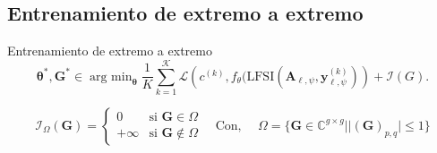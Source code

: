 \documentclass[aspectratio=169,t,xcolor=table]{beamer}
\DeclareMathOperator*{\argmin}{arg \ min}
\begin{document}
\subsection{Entrenamiento de extremo a extremo}
\begin{frame}{Entrenamiento de extremo a extremo}
\tiny
\begin{equation}
\mathbf{\theta}^*, \mathbf{G}^* \in  \argmin_{\mathbf{\theta}} \frac{1}{K}\sum_{k = 1}^{\mathcal{K}} \mathcal{L}\left( c^{(k)}, f_\theta(\mathrm{LFSI}\left(\mathbf{A}_{\ell,\psi},\mathbf{y}_{\ell, \psi}^{(k)}\right)\right) + \mathcal{I}(G).
\end{equation}

$$ \mathcal{I}_{\Omega}(\mathbf{G})=  \left\{\begin{matrix}
 0& \text{si } \mathbf{G}\in \Omega \\ 
+\infty & \text{si } \mathbf{G}\notin \Omega 
\end{matrix}\right. \quad \text{Con, }\quad \Omega=\{\mathbf{G}\in\mathbb{C}^{g\times g}| |(\mathbf{G})_{p,q}|\leq 1\}$$




\end{frame}
\end{document}
